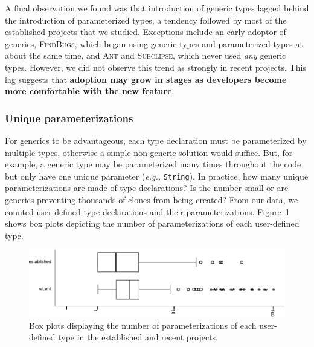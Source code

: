 \documentclass{svjour3}
\newcommand{\code}[1]{\texttt{#1}}
\newcommand{\todo}[1]{}
\newcommand{\jedit}{\textsc{JEdit}\xspace}
\newcommand{\findbugs}{\textsc{FindBugs}\xspace}
\newcommand{\ant}{\textsc{Ant}\xspace}
\newcommand{\subclipse}{\textsc{Subclipse}\xspace}
\begin{document}

A final observation we found was that introduction of generic types lagged behind the introduction of parameterized types, 
a tendency followed by most of the established projects that we studied.
Exceptions include an early adoptor of generics, \findbugs, which began using generic types and parameterized types
at about the same time, and \ant and \subclipse, 
which never used \emph{any} generic types. However, we did not observe this trend as strongly in recent projects.\todo{Bird, can confirm this?}
This lag suggests that \textbf{adoption may grow in stages as 
developers become more comfortable with the new feature}.

\subsubsection{Unique parameterizations}\label{sec:uniqueparams}

For generics to be advantageous, each type declaration must 
be parameterized by multiple types, 
otherwise a simple non-generic solution would suffice.
But, for example, a generic type may be parameterized many times throughout the 
code but only have one unique parameter (\emph{e.g.,} \code{String}).  
In practice, how many unique parameterizations are made of type declarations?
Is the number small or are generics preventing thousands of clones from being created? 
From our data, we counted user-defined type declarations and their parameterizations.
Figure~\ref{fig:unique-boxplot} shows box plots depicting the 
number of parameterizations of each user-defined type.

\begin{figure}[t]
	\includegraphics[width=\textwidth]{unique-boxplot.pdf}
	\caption{Box plots displaying the number of parameterizations
	of each user-defined type in the established and recent projects.}
	\label{fig:unique-boxplot}
\end{figure}
\end{document}
